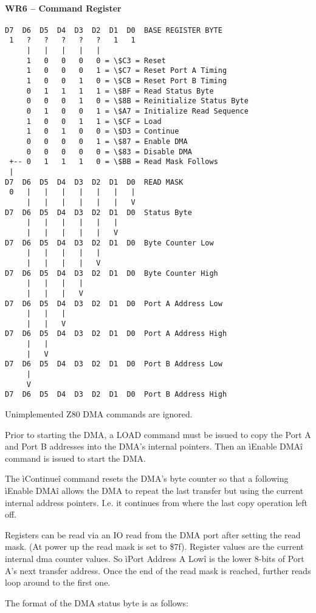 \paragraph{WR6 – Command Register}
\begin{verbatim}
D7  D6  D5  D4  D3  D2  D1  D0  BASE REGISTER BYTE
 1   ?   ?   ?   ?   ?   1   1
     |   |   |   |   |
     1   0   0   0   0 = \$C3 = Reset
     1   0   0   0   1 = \$C7 = Reset Port A Timing
     1   0   0   1   0 = \$CB = Reset Port B Timing
     0   1   1   1   1 = \$BF = Read Status Byte
     0   0   0   1   0 = \$8B = Reinitialize Status Byte
     0   1   0   0   1 = \$A7 = Initialize Read Sequence
     1   0   0   1   1 = \$CF = Load
     1   0   1   0   0 = \$D3 = Continue
     0   0   0   0   1 = \$87 = Enable DMA
     0   0   0   0   0 = \$83 = Disable DMA
 +-- 0   1   1   1   0 = \$BB = Read Mask Follows
 |
D7  D6  D5  D4  D3  D2  D1  D0  READ MASK
 0   |   |   |   |   |   |   |
     |   |   |   |   |   |   V
D7  D6  D5  D4  D3  D2  D1  D0  Status Byte
     |   |   |   |   |   |
     |   |   |   |   |   V
D7  D6  D5  D4  D3  D2  D1  D0  Byte Counter Low
     |   |   |   |   |
     |   |   |   |   V
D7  D6  D5  D4  D3  D2  D1  D0  Byte Counter High
     |   |   |   |
     |   |   |   V
D7  D6  D5  D4  D3  D2  D1  D0  Port A Address Low
     |   |   |
     |   |   V
D7  D6  D5  D4  D3  D2  D1  D0  Port A Address High
     |   |
     |   V
D7  D6  D5  D4  D3  D2  D1  D0  Port B Address Low
     |
     V
D7  D6  D5  D4  D3  D2  D1  D0  Port B Address High
\end{verbatim}
Unimplemented Z80 DMA commands are ignored.

Prior to starting the DMA, a LOAD command must be issued to copy the
Port A and Port B addresses into the DMA's internal pointers. Then an
ìEnable DMAî command is issued to start the DMA.

The ìContinueî command resets the DMA’s byte counter so that a
following ìEnable DMAî allows the DMA to repeat the last transfer but
using the current internal address pointers. I.e. it continues from
where the last copy operation left off.

Registers can be read via an IO read from the DMA port after setting
the read mask. (At power up the read mask is set to \$7f). Register
values are the current internal dma counter values. So ìPort Address A
Lowî is the lower 8-bits of Port A’s next transfer address. Once the
end of the read mask is reached, further reads loop around to the
first one.

The format of the DMA status byte is as follows:

